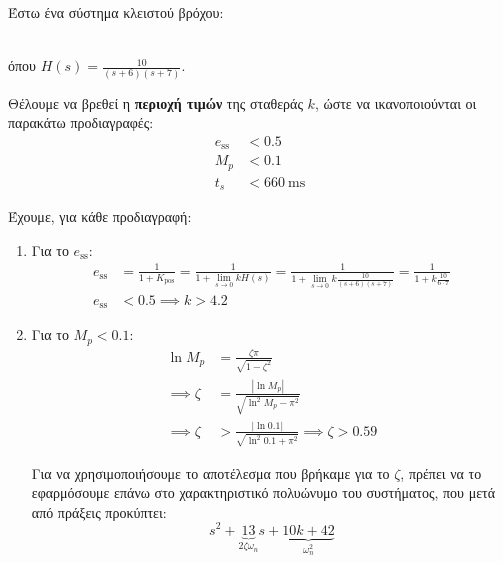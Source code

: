 \documentclass[11pt,a4paper,notitlepage,fleqn,final]{article}
\begin{document}
\begin{exercise}
Έστω ένα σύστημα κλειστού βρόχου:
 \\
όπου \( \displaystyle H(s) = \frac{10}{(s+6)(s+7)} \).

Θέλουμε να βρεθεί η \textbf{περιοχή τιμών} της σταθεράς \( k \), ώστε να ικανοποιούνται οι
παρακάτω προδιαγραφές:
\begin{align*}
	e_{\mathrm{ss}} &< 0.5 \\
	M_p &< 0.1 \\
	t_s &< 660\ \mathrm{ms}
\end{align*}

\tcblower

Έχουμε, για κάθε προδιαγραφή:
\begin{enumerate}
	\item Για το \( e_{\mathrm{ss}} \):
	\begin{align*}
		e_{\mathrm{ss}} &= \frac{1}{1+K_{\mathrm{pos}}}
		= \frac{1}{1+\lim_{s\to 0}kH(s)}
		= \frac{1}{1+\lim_{s\to 0}k\frac{10}{(s+6)(s+7)}}
		= \frac{1}{1+k\frac{10}{6\cdot 7}} \\
		e_{\mathrm{ss}} &< 0.5 \implies \boxed{k > 4.2}
	\end{align*}
	\item Για το \( M_p < 0.1 \):
	\begin{align*}
		\ln M_p &= \frac{ζπ}{\sqrt{1-ζ^2}}\\
		\implies ζ &= \frac{\left\lvert \ln M_p \right\rvert}{
			\sqrt{\ln^2 M_p - π^2}
			}\\
		\implies ζ &> \frac{|\ln 0.1 |}{\sqrt{\ln^2 0.1 + π^2}}
		\implies \boxed{ζ > 0.59}
	\end{align*}
	
	Για να χρησιμοποιήσουμε το αποτέλεσμα που βρήκαμε για το \( ζ \), πρέπει να το
	εφαρμόσουμε επάνω στο χαρακτηριστικό πολυώνυμο του συστήματος, που μετά από πράξεις
	προκύπτει:
	\[
	s^2+
	\underbrace{13}_{2ζ\omega_n}s
	+\underbrace{10k+42}_{\omega_n^2}
	\]
	

\end{enumerate}
\end{exercise}
\end{document}
